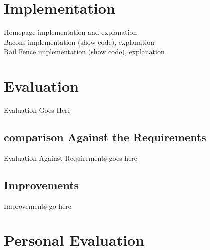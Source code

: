 \documentclass[10pt, a4paper]{article}
\begin{document}
	
	\section{Implementation}
	Homepage implementation and explanation\\Bacons implementation (show code), explanation \\ Rail Fence implementation (show code), explanation
	
	\section{Evaluation}
	Evaluation Goes Here
	
	\subsection{comparison Against the Requirements}
	Evaluation Against Requirements goes here
	
	\subsection{Improvements}
	Improvements go here
    
    
	\section{Personal Evaluation}
		
	
	
		
\end{document}
